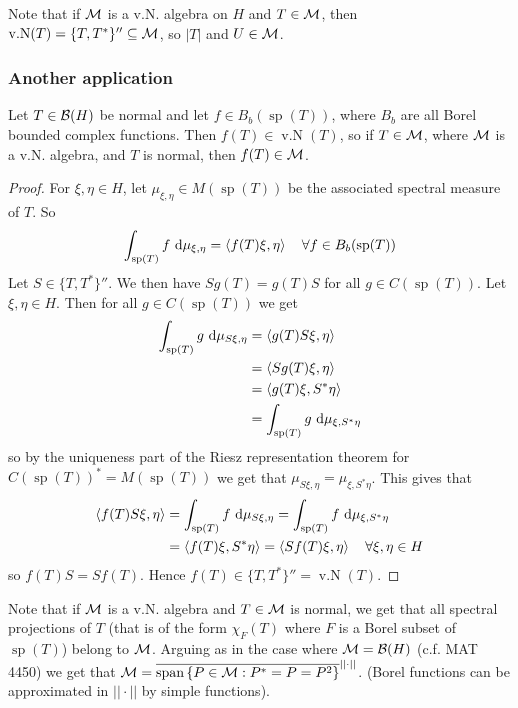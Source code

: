 \documentclass[10pt,english,a4paper]{article}
\theoremstyle{definition}
\DeclareMathOperator{\Sp}{sp}
\DeclareMathOperator{\vN}{v.N}
\begin{document}
Note that if $\mathcal{M}$ is a v.N. algebra on $H$ and $T \in \mathcal{M}$, then 
$\vN(T) = \{T,T^*\}'' \subseteq \Ms$, so $|T|$ and $U \in \mathcal{M}$. 

\subsubsection*{Another application}
Let $T \in \mathcal{B}(H)$ be normal and let $f \in B_{b}(\Sp(T))$, where 
$B_{b}$ are all Borel bounded complex functions. Then 
$f(T) \in \vN(T)$, so if $T \in \mathcal{M}$, where $\mathcal{M}$ is a v.N. algebra, and 
$T$ is normal, then $f(T) \in \mathcal{M}$. 
\begin{proof}
    For $\xi,\eta \in H$, let $\mu_{\xi,\eta} \in M(\Sp(T))$ be the associated 
spectral measure of $T$. 
So 
\[ \int_{\Sp(T)} f \d\mu_{\xi,\eta} = \ind{f(T)\xi,\eta} \quad\forall f \in B_{b}(\Sp(T)) \]
Let $S \in\{T, T^*\}''$. We then have 
$Sg(T) = g(T)S$ for all $g \in C(\Sp(T))$. 
Let $\xi,\eta \in H$. Then for all $g \in C(\Sp(T))$ we get 
\begin{align*}
    \int_{\Sp(T)} g \d\mu_{S\xi,\eta} &= \ind{g(T)S\xi,\eta} \\
    &= \ind{Sg(T)\xi,\eta} \\
    &= \ind{g(T)\xi,S^*\eta} \\
    &= \int_{\Sp(T)} g \d \mu_{\xi,S^*\eta}
\end{align*}
so by the uniqueness part of the Riesz representation theorem for 
$C(\Sp(T))^* = M(\Sp(T))$ we get that 
$\mu_{S\xi,\eta} = \mu_{\xi,S^*\eta}$.
This gives that 
\begin{align*}
    \ind{f(T)S\xi,\eta} 
&= \int_{\Sp(T)} f\d\mu_{S\xi,\eta} 
= \int_{\Sp(T)} f\d\mu_{\xi,S^*\eta} \\
&= \ind{f(T)\xi, S^*\eta} 
= \ind{Sf(T)\xi,\eta} \quad \forall \xi,\eta \in H
\end{align*}
so $f(T)S = Sf(T)$. Hence $f(T) \in \{T,T^*\}'' = \vN(T)$.
\end{proof}
Note that if $\mathcal{M}$ is a v.N. algebra and $T \in \mathcal{M}$ is normal, we get that all
spectral projections of $T$ (that is of the form $\chi_F(T)$ where $F$ is a Borel
subset of $\Sp(T)$) belong to $\mathcal{M}$.
Arguing as in the case where $\mathcal{M} = \mathcal{B}(H)$ (c.f. MAT 4450) we get that 
$\mathcal{M} = \overline{\text{span} \left\{P\in \mathcal{M}: P^* = P = P^2\right\}}^{||\cdot||}$.
(Borel functions can be approximated in $||\cdot||$ by simple functions). 
\end{document}
